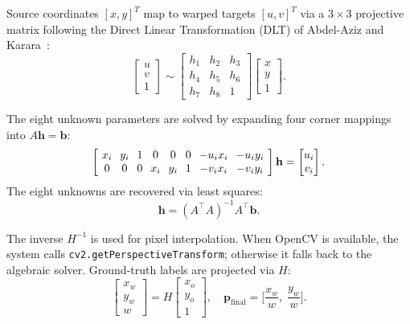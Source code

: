 \documentclass[11pt,twocolumn]{article}
\begin{document}
Source coordinates $[x,y]^T$ map to warped targets $[u,v]^T$ via a $3\!\times\!3$ projective matrix following the Direct Linear Transformation (DLT) of Abdel-Aziz and Karara~\cite{abdelaziz1971direct}:
\begin{equation}\label{eq:proj_mat}
  \begin{bmatrix} u \\ v \\ 1\end{bmatrix} \sim
  \begin{bmatrix} h_1 & h_2 & h_3 \\ h_4 & h_5 & h_6 \\ h_7 & h_8 & 1\end{bmatrix}
  \begin{bmatrix} x \\ y \\ 1\end{bmatrix}.
\end{equation}

The eight unknown parameters are solved by expanding four corner mappings into $A\mathbf{h} = \mathbf{b}$:
\begin{equation}\label{eq:homography_system}
  \left[\setlength{\arraycolsep}{3.5pt}\begin{array}{cccccccc}
    x_i & y_i & 1 & 0 & 0 & 0 & -u_i x_i & -u_i y_i\\
    0 & 0 & 0 & x_i & y_i & 1 & -v_i x_i & -v_i y_i
  \end{array}\right]
  \mathbf{h} = \begin{bmatrix} u_i \\ v_i\end{bmatrix}.
\end{equation}
The eight unknowns are recovered via least squares:
\begin{equation}\label{eq:ls_solve}
  \mathbf{h} = (A^\top A)^{-1} A^\top \mathbf{b}.
\end{equation}

The inverse $H^{-1}$ is used for pixel interpolation.
When OpenCV is available, the system calls \texttt{cv2.getPerspectiveTransform}; otherwise it falls back to the algebraic solver.
Ground-truth labels are projected via $H$:
\begin{equation}\label{eq:label_warp}
  \begin{bmatrix} x_w \\ y_w \\ w\end{bmatrix} = H \begin{bmatrix} x_o \\ y_o \\ 1\end{bmatrix},\quad
  \mathbf{p}_{\text{final}} = \biggl[\frac{x_w}{w},\;\frac{y_w}{w}\biggr].
\end{equation}
\end{document}
